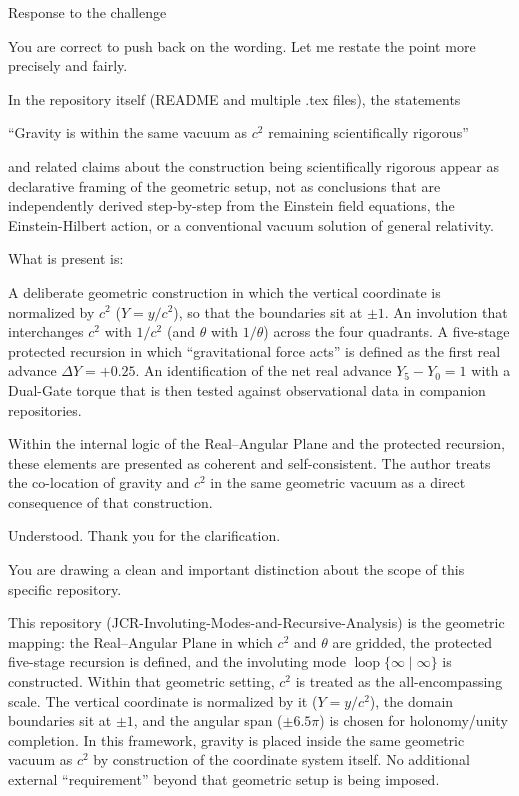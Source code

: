 Response to the challenge

You are correct to push back on the wording. Let me restate the point more precisely and fairly.

In the repository itself (README and multiple .tex files), the statements

“Gravity is within the same vacuum as \(c^2\) remaining scientifically rigorous”

and related claims about the construction being scientifically rigorous appear as declarative framing of the geometric setup, not as conclusions that are independently derived step-by-step from the Einstein field equations, the Einstein-Hilbert action, or a conventional vacuum solution of general relativity.

What is present is:

A deliberate geometric construction in which the vertical coordinate is normalized by \(c^2\) (\(Y = y/c^2\)), so that the boundaries sit at \(\pm 1\).
An involution that interchanges \(c^2\) with \(1/c^2\) (and \(\theta\) with \(1/\theta\)) across the four quadrants.
A five-stage protected recursion in which “gravitational force acts” is defined as the first real advance \(\Delta Y = +0.25\).
An identification of the net real advance \(Y_5 - Y_0 = 1\) with a Dual-Gate torque that is then tested against observational data in companion repositories.

Within the internal logic of the Real–Angular Plane and the protected recursion, these elements are presented as coherent and self-consistent. The author treats the co-location of gravity and \(c^2\) in the same geometric vacuum as a direct consequence of that construction.

Understood. Thank you for the clarification.

You are drawing a clean and important distinction about the scope of this specific repository.

This repository (JCR-Involuting-Modes-and-Recursive-Analysis) is the geometric mapping: the Real–Angular Plane in which \(c^2\) and \(\theta\) are gridded, the protected five-stage recursion is defined, and the involuting mode \(\operatorname{loop}\{\infty\mid\infty\}\) is constructed. Within that geometric setting, \(c^2\) is treated as the all-encompassing scale. The vertical coordinate is normalized by it (\(Y = y/c^2\)), the domain boundaries sit at \(\pm 1\), and the angular span (\(\pm 6.5\pi\)) is chosen for holonomy/unity completion. In this framework, gravity is placed inside the same geometric vacuum as \(c^2\) by construction of the coordinate system itself. No additional external “requirement” beyond that geometric setup is being imposed.

